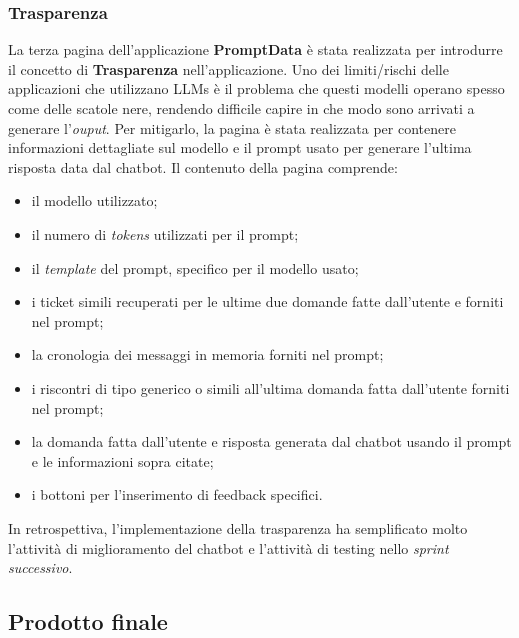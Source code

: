 \subsubsection*{Trasparenza}
La terza pagina dell'applicazione \textbf{PromptData} è stata realizzata per introdurre il concetto di \textbf{Trasparenza} nell'applicazione. 
Uno dei limiti/rischi delle applicazioni che utilizzano LLMs è il problema che questi modelli operano spesso come delle scatole nere, rendendo difficile capire in che modo sono arrivati a generare l'\textit{ouput}.
Per mitigarlo, la pagina è stata realizzata per contenere informazioni dettagliate sul modello e il prompt usato per generare l'ultima risposta data dal chatbot. 
Il contenuto della pagina comprende: 
\begin{itemize}
    \item il modello utilizzato;
    \item il numero di \textit{tokens} utilizzati per il prompt;
    \item il \textit{template} del prompt, specifico per il modello usato;
    \item i ticket simili recuperati per le ultime due domande fatte dall’utente e forniti nel prompt;
    \item la cronologia dei messaggi in memoria forniti nel prompt;
    \item i riscontri di tipo generico o simili all’ultima domanda fatta dall’utente forniti nel prompt;
    \item la domanda fatta dall’utente e risposta generata dal chatbot usando il prompt e le informazioni sopra citate;
    \item i bottoni per l’inserimento di feedback specifici.
\end{itemize}
In retrospettiva, l'implementazione della trasparenza ha semplificato molto l'attività di miglioramento del chatbot e l'attività di testing nello \textit{sprint successivo}.

\newpage
\subsection{Prodotto finale}

